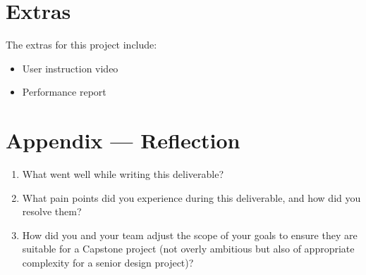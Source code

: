 \documentclass{article}
\begin{document}
\section{Extras}\label{sec:extras}


\raggedright

The extras for this project include:
\begin{itemize}
    \item User instruction video
    \item Performance report
\end{itemize}

\newpage{}

\section*{Appendix --- Reflection}

\begin{enumerate}
    \item What went well while writing this deliverable?
    \item What pain points did you experience during this deliverable, and how
    did you resolve them?
    \item How did you and your team adjust the scope of your goals to ensure
    they are suitable for a Capstone project (not overly ambitious but also of
    appropriate complexity for a senior design project)?
\end{enumerate}

%
\end{document}

